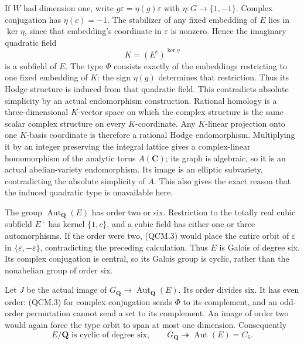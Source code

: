 If $W$ had dimension one, write
$g\varepsilon=\eta(g)\varepsilon$ with
$\eta:G\to\{1,-1\}$. Complex conjugation has
$\eta(c)=-1$. The stabilizer of any fixed embedding of
$E$ lies in $\ker\eta$, since that embedding's coordinate
in $\varepsilon$ is nonzero. Hence the imaginary quadratic
field
\[
                    K=(E^c)^{\ker\eta}
\]
is a subfield of $E$. The type $\Phi$ consists exactly of
the embeddings restricting to one fixed embedding of
$K$: the sign $\eta(g)$ determines that restriction.
Thus its Hodge structure is induced from that quadratic
field. This contradicts absolute simplicity by an actual
endomorphism construction. Rational homology is a
three-dimensional $K$-vector space on which the complex
structure is the same scalar complex structure on every
$K$-coordinate. Any $K$-linear projection onto one
$K$-basis coordinate is therefore a rational Hodge
endomorphism. Multiplying it by an integer preserving the
integral lattice gives a complex-linear homomorphism of
the analytic torus $A(\mathbf C)$; its graph is algebraic,
so it is an actual abelian-variety endomorphism. Its image
is an elliptic subvariety, contradicting the absolute
simplicity of $A$. This also gives the exact reason that
the induced quadratic type is unavailable here.

The group $\operatorname{Aut}_{\mathbf Q}(E)$ has order
two or six. Restriction to the totally real cubic
subfield $E^+$ has kernel $\{1,c\}$, and a cubic field
has either one or three automorphisms. If the order
were two, (QCM.3) would place the entire orbit of
$\varepsilon$ in $\{\varepsilon,-\varepsilon\}$,
contradicting the preceding calculation. Thus $E$ is
Galois of degree six. Its complex conjugation is central,
so its Galois group is cyclic, rather than the
nonabelian group of order six.

Let $J$ be the actual image of
$G_{\mathbf Q}\to\operatorname{Aut}_{\mathbf Q}(E)$.
Its order divides six. It has even order: (QCM.3) for
complex conjugation sends $\Phi$ to its complement,
and an odd-order permutation cannot send a set to its
complement. An image of order two would again force
the type orbit to span at most one dimension.
Consequently
\[
 E/\mathbf Q\text{ is cyclic of degree six},\qquad
 G_{\mathbf Q}\twoheadrightarrow\operatorname{Aut}(E)=C_6.
                                                               \tag{QCM.4}
\]


